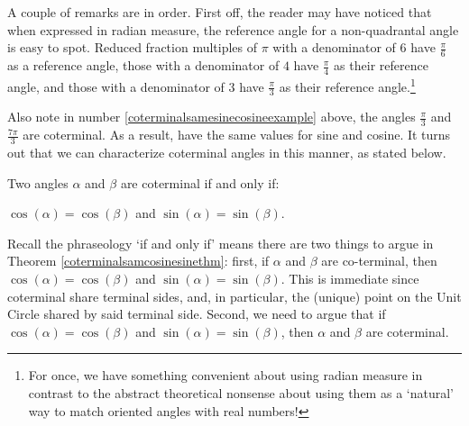 \documentclass{ximera}
\begin{document}
\begin{example}
\begin{explanation}
\begin{enumerate}
\begin{image}
\end{image}

\end{enumerate}

\end{explanation}

\end{example}


A couple of remarks are in order.  First off,  the reader may have noticed that when expressed in radian measure, the reference angle for a non-quadrantal angle is easy to spot.  Reduced fraction multiples of $\pi$ with a denominator of $6$ have $\frac{\pi}{6}$ as a reference angle, those with a denominator of $4$ have $\frac{\pi}{4}$ as their reference angle, and those with a denominator of $3$ have $\frac{\pi}{3}$ as their reference angle.\footnote{For once, we have something convenient about using radian measure in contrast to the abstract theoretical nonsense about using them as a `natural' way to match oriented angles with real numbers!}   



Also note in number \ref{coterminalsamesinecosineexample} above, the angles $\frac{\pi}{3}$ and $\frac{7\pi}{3}$ are coterminal.  As a result, have the same values for sine and cosine.  It turns out that we can characterize coterminal angles in this manner, as stated below.





\begin{theorem} \label{coterminalsamcosinesinethm}  Two angles $\alpha$ and $\beta$ are coterminal if and only if:

 \centerline{$\cos(\alpha) =  \cos(\beta)$ and  $\sin(\alpha) =  \sin(\beta)$.}



\end{theorem}




Recall the phraseology `if and only if' means there are two things to argue in Theorem \ref{coterminalsamcosinesinethm}:  first, if $\alpha$ and $\beta$ are co-terminal, then $\cos(\alpha) =  \cos(\beta)$ and $\sin(\alpha) =  \sin(\beta)$.  This is immediate since coterminal share terminal sides, and, in particular, the (unique) point on the Unit Circle shared by said terminal side.  Second, we need to argue that if $\cos(\alpha) =  \cos(\beta)$ and $\sin(\alpha) =  \sin(\beta)$, then $\alpha$ and $\beta$ are coterminal.  
\end{document}
